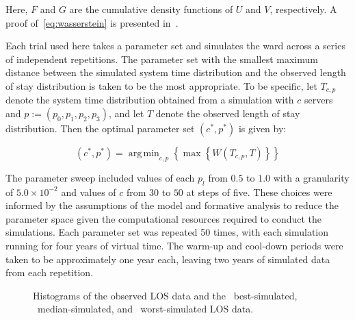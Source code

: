 \documentclass[]{interact}
\theoremstyle{plain}%
\theoremstyle{definition}
\theoremstyle{remark}
\DeclareMathOperator*{\argmin}{arg\,min}
\begin{document}
Here, \(F\) and \(G\) are the cumulative density functions of \(U\) and \(V\),
respectively. A proof of~\eqref{eq:wasserstein} is presented
in~\cite{Ramdas2017}.

Each trial used here takes a parameter set and simulates the ward across a
series of independent repetitions. The parameter set with the smallest maximum
distance between the simulated system time distribution and the observed length
of stay distribution is taken to be the most appropriate. To be specific, let
\(T_{c,p}\) denote the system time distribution obtained from a simulation with
\(c\) servers and \(p := \left(p_0,p_1,p_2,p_3\right)\), and let \(T\) denote
the observed length of stay distribution. Then the optimal parameter set
\(\left(c^*, p^*\right)\) is given by:

\begin{equation}\label{eq:parameters}
    \left(c^*, p^*\right) = \argmin_{c, p} \left\{%
        \max \left\{ W\left(T_{c,p}, T\right) \right\}%
    \right\}
\end{equation}

The parameter sweep included values of each \(p_l\) from \(0.5\) to \(1.0\) with
a granularity of \(5.0 \times 10^{-2}\) and values of \(c\) from \(30\) to
\(50\) at steps of five. These choices were informed by the assumptions of the
model and formative analysis to reduce the parameter space given the
computational resources required to conduct the simulations. Each parameter set
was repeated 50 times, with each simulation running for four years of virtual
time. The warm-up and cool-down periods were taken to be approximately one year
each, leaving two years of simulated data from each repetition.

\begin{figure}
    \centering


    \caption{%
        Histograms of the observed LOS data and the
        ~best-simulated,
        ~median-simulated, and
        ~worst-simulated LOS data.
    }\label{fig:params}
\end{figure}
\end{document}
